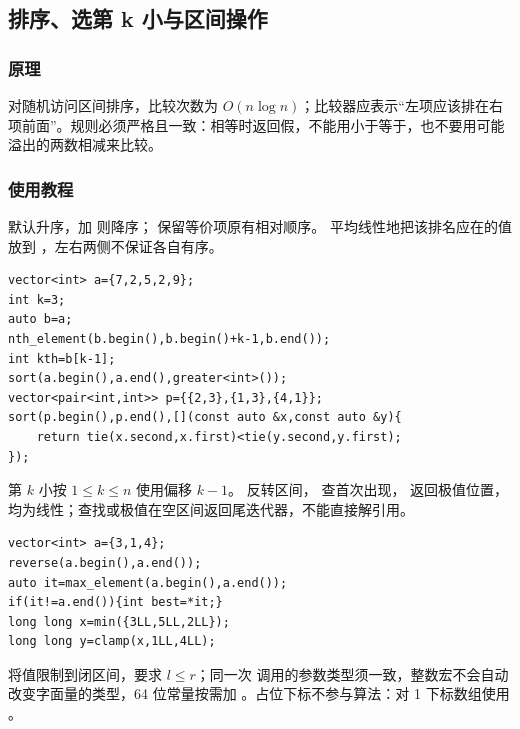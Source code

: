 \subsection{排序、选第 k 小与区间操作}
\label{stl:sort}
\subsubsection*{原理}
 对随机访问区间排序，比较次数为 $O(n\log n)$；比较器应表示“左项应该排在右项前面”。规则必须严格且一致：相等时返回假，不能用小于等于，也不要用可能溢出的两数相减来比较。
\subsubsection*{使用教程}
 默认升序，加  则降序； 保留等价项原有相对顺序。 平均线性地把该排名应在的值放到 ，左右两侧不保证各自有序。
\begin{lstlisting}[style=mtycpp,numbers=none]
vector<int> a={7,2,5,2,9};
int k=3;
auto b=a;
nth_element(b.begin(),b.begin()+k-1,b.end());
int kth=b[k-1];
sort(a.begin(),a.end(),greater<int>());
vector<pair<int,int>> p={{2,3},{1,3},{4,1}};
sort(p.begin(),p.end(),[](const auto &x,const auto &y){
	return tie(x.second,x.first)<tie(y.second,y.first);
});
\end{lstlisting}
第 $k$ 小按 $1\le k\le n$ 使用偏移 $k-1$。 反转区间， 查首次出现， 返回极值位置，均为线性；查找或极值在空区间返回尾迭代器，不能直接解引用。
\begin{lstlisting}[style=mtycpp,numbers=none]
vector<int> a={3,1,4};
reverse(a.begin(),a.end());
auto it=max_element(a.begin(),a.end());
if(it!=a.end()){int best=*it;}
long long x=min({3LL,5LL,2LL});
long long y=clamp(x,1LL,4LL);
\end{lstlisting}
 将值限制到闭区间，要求 $l\le r$；同一次  调用的参数类型须一致，整数宏不会自动改变字面量的类型，64 位常量按需加 。占位下标不参与算法：对 1 下标数组使用 。
